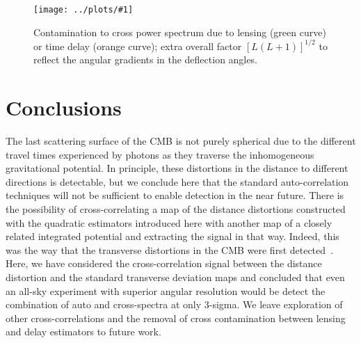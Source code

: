 \documentclass[prd,amsmath,amssymb,floatfix,superscriptaddress,nofootinbib,twocolumn]{revtex4-1}
\def\be{\begin{equation}}
\def\ee{\end{equation}}
\def\bea{\begin{eqnarray}}
\def\eea{\end{eqnarray}}
\newcommand{\sfig}[2]{
\texttt{[image: ../plots/\#1]}
        }
\newcommand{\Sfig}[2]{
   \begin{figure}[thbp]
   \begin{center}
    \sfig{#1.pdf}{\columnwidth}
    \caption{{\small #2}}
    \label{fig:#1}
     \end{center}
   \end{figure}
}
\newcommand{\peikai}[1]{{\color{blue} #1}}
\begin{document}
\Sfig{Cont_PtoD}{Contamination to cross power spectrum due to lensing (green curve) or time delay (orange curve); extra overall factor $[L(L+1)]^{1/2}$ to reflect the angular gradients in the deflection angles.}

\section{Conclusions}

The last scattering surface of the CMB is not purely spherical due to the different travel times experienced by photons as they traverse the inhomogeneous gravitational potential. In principle, these distortions in the distance to different directions is detectable, but we conclude here that the standard auto-correlation techniques will not be sufficient to enable detection in the near future. There is the possibility of cross-correlating a map of the distance distortions constructed with the quadratic estimators introduced here with another map of a closely related integrated potential and extracting the signal in that way. Indeed, this was the way that the transverse distortions in the CMB were first detected~\cite{Smith:2007rg}. Here, we have considered  the cross-correlation signal between the distance distortion and the standard transverse deviation maps and concluded that even an all-sky experiment with superior angular resolution would be detect the combination of auto and cross-spectra at only 3-sigma. We leave exploration of other cross-correlations and the removal of cross contamination between lensing and delay estimators to future work.
\end{document}
